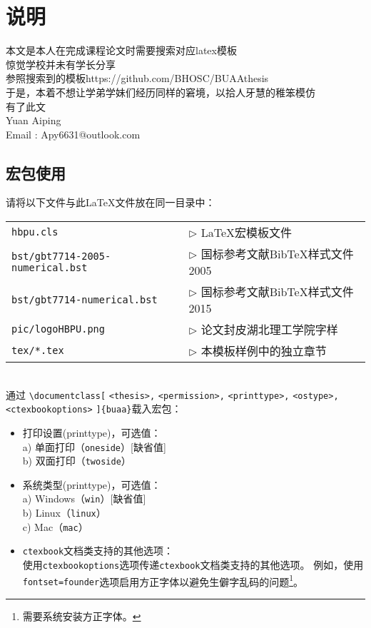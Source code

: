 \chapter{说明}

本文是本人在完成课程论文时需要搜索对应latex模板\\
惊觉学校并未有学长分享\\
参照搜索到的模板\indent https://github.com/BHOSC/BUAAthesis\\
于是，本着不想让学弟学妹们经历同样的窘境，以拾人牙慧的稚笨模仿\\
有了此文\\
Yuan Aiping\\
\indent Email : Apy6631@outlook.com

\section{宏包使用}

请将以下文件与此LaTeX文件放在同一目录中：

\begin{tabular}{ll}
 \verb|hbpu.cls |                 & $\triangleright$ LaTeX宏模板文件 \\
 \verb|bst/gbt7714-2005-numerical.bst|      & $\triangleright$ 国标参考文献BibTeX样式文件2005 \\
 \verb|bst/gbt7714-numerical.bst|      & $\triangleright$ 国标参考文献BibTeX样式文件2015 \\
 \verb|pic/logoHBPU.png|         & $\triangleright$ 论文封皮湖北理工学院字样 \\
 \verb|tex/*.tex|                 & $\triangleright$ 本模板样例中的独立章节\\
\end{tabular}\\

通过 \verb|\documentclass[| \verb|<thesis>,| \verb|<permission>,| \verb|<printtype>,| \verb|<ostype>,| \verb|<ctexbookoptions>| \verb|]{buaa}|载入宏包：
\begin{itemize}[leftmargin=3cm]

  \item[{\tt printtype} $\triangleright$] 打印设置(printtype)，可选值： \\
    a) 单面打印（\verb|oneside|）[缺省值]\\
    b) 双面打印（\verb|twoside|）
  \item[{\tt ostype} $\triangleright$] 系统类型(printtype)，可选值： \\
    a) Windows（\verb|win|）[缺省值]\\
    b) Linux（\verb|linux|）\\
    c) Mac（\verb|mac|）
  \item[{\tt ctexbookoptions} $\triangleright$] {\tt ctexbook}文档类支持的其他选项： \\
    使用{\tt ctexbookoptions}选项传递{\tt ctexbook}文档类支持的其他选项。
    例如，使用{\tt fontset=founder}选项启用方正字体以避免生僻字乱码的问题\footnote{需要系统安装方正字体。}。
\end{itemize}


